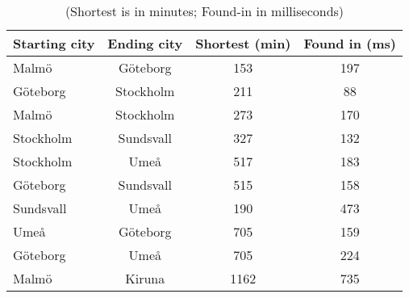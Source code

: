 \documentclass[a4paper,11pt]{article}
\begin{document}
\begin{table}[h]
\begin{center}
\begin{tabular}{l|c|c|c}
\textbf{Starting city} & \textbf{Ending city} & \textbf{Shortest (min)} & \textbf{Found in (ms)}\\
\hline
  Malmö      &  Göteborg     &  153     &  197\\
  Göteborg      &  Stockholm     &  211     &  88\\
  Malmö      &  Stockholm     &  273     &  170\\
  Stockholm      &  Sundsvall     &  327     &  132\\
  Stockholm      &  Umeå     &  517     &  183\\
  Göteborg      &  Sundsvall     &  515     &  158\\
  Sundsvall      &  Umeå     &  190     &  473\\
  Umeå      &  Göteborg     &  705     &  159\\
  Göteborg      &  Umeå     &  705     &  224\\
  Malmö      &  Kiruna     &  1162     &  735\\
\end{tabular}
\caption{(Shortest is in minutes; Found-in in milliseconds)}
\label{tab:table1}
\end{center}
\end{table}
\end{document}

